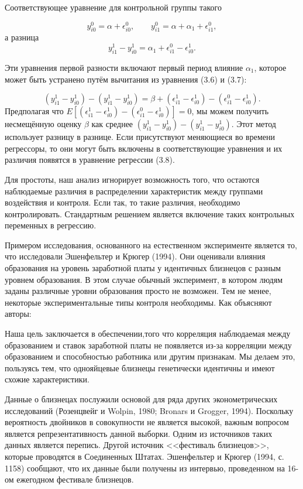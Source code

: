 Соответствующее уравнение для контрольной группы такого

\[
y^{0}_{i0}=\alpha+\epsilon^{0}_{i0}, \qquad
y^{0}_{i1}=\alpha+\alpha_{1}+\epsilon^{0}_{i1},
\]
а разница
\begin{equation}
y^{1}_{i1}-y^{1}_{i0}=\alpha_{1}+\epsilon^{0}_{i1}-\epsilon^{1}_{i0}.
\end{equation}

Эти уравнения первой разности включают первый период влияние $\alpha_{1}$, которое может быть устранено путём вычитания из уравнения (3.6) и (3.7):

\begin{equation}
(y^{1}_{i1}-y^{1}_{i0})-(y^{1}_{i1}-y^{1}_{i0})=\beta+(\epsilon^{1}_{i1}-\epsilon^{1}_{i0})-(\epsilon^{0}_{i1}-\epsilon^{1}_{i0}).
\end{equation}
Предполагая что $E[(\epsilon^{1}_{i1}-\epsilon^{1}_{i0})-(\epsilon^{0}_{i1}-\epsilon^{1}_{i0})]=0$, мы можем получить несмещённую оценку $\beta$ как среднее $(y^{1}_{i1}-y^{1}_{i0})-(y^{1}_{i1}-y^{1}_{i0})$. Этот метод использует разницу в разнице. Если присутствуют меняющиеся во времени регрессоры, то они могут быть включены в соответствующие уравнения и их различия появятся в уравнение регрессии (3.8).


Для простоты, наш анализ игнорирует возможность того, что остаются наблюдаемые различия в распределении характеристик между группами воздействия и контроля. Если так, то такие различия, необходимо контролировать. Стандартным решением является включение таких контрольных переменных в регрессию.


Примером исследования, основанного на естественном эксперименте является то, что исследовали Эшенфельтер и Крюгер (1994). Они оценивали влияния образования на уровень заработной платы у идентичных близнецов с разным уровнем образования. В этом случае обычный эксперимент, в котором людям заданы различные уровни образования просто не возможен. Тем не менее, некоторые экспериментальные типы контроля необходимы. Как объясняют авторы:


Наша цель заключается в обеспечении,того что корреляция наблюдаемая между образованием и ставок заработной платы не появляется из-за корреляции между образованием и способностью работника или другим признакам. Мы делаем это, пользуясь тем, что однояйцевые близнецы генетически идентичны и имеют схожие характеристики.


Данные о близнецах послужили основой для ряда других эконометрических исследований (Розенцвейг и Wolpin, 1980; Bronars и Grogger, 1994). Поскольку вероятность двойников в совокупности не является высокой, важным вопросом  является репрезентативность данной выборки. Одним из источников таких данных является перепись. Другой источник <<фестиваль близнецов>>, которые проводятся в Соединенных Штатах. Эшенфельтер и Крюгер (1994, с. 1158) сообщают, что их данные были получены из интервью, проведенном на 16-ом ежегодном фестивале близнецов.


